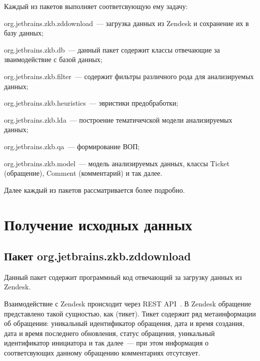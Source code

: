 Каждый из пакетов выполняет соответсвующую ему задачу:

\begin{itemize*}
\item org.jetbrains.zkb.zddownload~--- загрузка данных из Zendesk и сохранение их в базу данных;
\item org.jetbrains.zkb.db~--- данный пакет содержит классы отвечающие за зваимодействие с базой данных;
\item org.jetbrains.zkb.filter~--- содержит фильтры различного рода для анализируемых данных;
\item org.jetbrains.zkb.heuristics~--- эвристики предобработки;
\item org.jetbrains.zkb.lda~--- построение тематичечской модели анализируемых данных;
\item org.jetbrains.zkb.qa~--- формирование ВОП;
\item org.jetbrains.zkb.model~--- модель анализируемых данных, классы Ticket (обращение), Comment (комментарий) и так далее.
\end{itemize*}

Далее каждый из пакетов рассматривается более подробно.

\section{Получение исходных данных}
\subsection{Пакет org.jetbrains.zkb.zddownload}

Данный пакет содержит программный код отвечающий за загрузку данных из Zendesk.

Взаимодействие с Zendesk происходит через REST API~\cite{zdapi}. В Zendesk обращение представлено такой сущностью, как  (тикет). Тикет содержит ряд метаинформации об обращении: уникальный идентификатор обращения, дата и время создания, дата и время последнего обновления, статус обращения, уникальный идентификатор инициатора и так далее~--- при этом информация о соответсвующих данному обращению комментариях отсутсвует.


